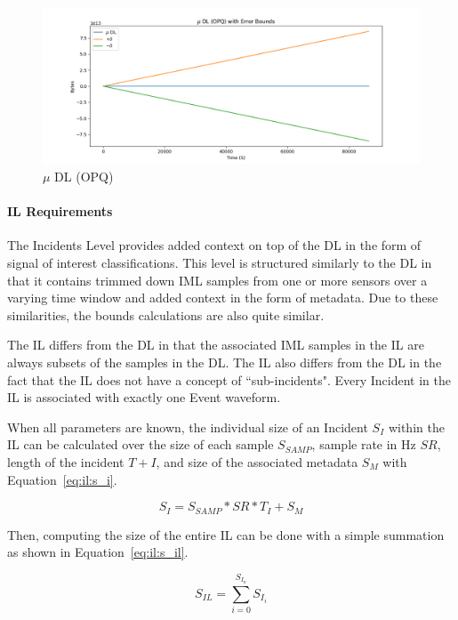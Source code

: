 \begin{figure}[H]
	\centering
	\includegraphics[width=\linewidth]{figures/plot_dl_opq_err.png}
	\caption{$\mu$ DL (OPQ)}
	\label{fig:plot_dl_opq_err}
\end{figure}

\paragraph{IL Requirements}
The Incidents Level provides added context on top of the DL in the form of signal of interest classifications. This level is structured similarly to the DL in that it contains trimmed down IML samples from one or more sensors over a varying time window and added context in the form of metadata. Due to these similarities, the bounds calculations are also quite similar.

The IL differs from the DL in that the associated IML samples in the IL are always subsets of the samples in the DL\@. The IL also differs from the DL in the fact that the IL does not have a concept of ``sub-incidents". Every Incident in the IL is associated with exactly one Event waveform.

When all parameters are known, the individual size of an Incident $S_{I}$ within the IL can be calculated over the size of each sample $S_{SAMP}$, sample rate in Hz $SR$, length of the incident $T+{I}$, and size of the associated metadata $S_{M}$ with Equation~\ref{eq:il:s_i}.

\begin{equation}\label{eq:il:s_i}
	S_{I} = S_{SAMP} * SR * T_{I} + S_{M}
\end{equation}

Then, computing the size of the entire IL can be done with a simple summation as shown in Equation~\ref{eq:il:s_il}.

\begin{equation}\label{eq:il:s_il}
	S_{IL} = \sum_{i=0}^{S_{I_{n}}} S_{I_{i}}
\end{equation}

